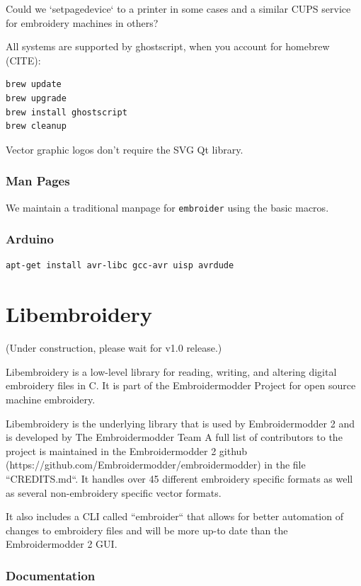 \documentclass[a4paper]{report}
\begin{document}
Could we `setpagedevice` to a printer in some cases and a similar CUPS service
for embroidery machines in others?

All systems are supported by ghostscript, when you account for homebrew (CITE):

\begin{lstlisting}
brew update
brew upgrade
brew install ghostscript
brew cleanup
\end{lstlisting}

Vector graphic logos don't require the SVG Qt library.

\subsection{Man Pages}

We maintain a traditional manpage for \texttt{embroider} using
the basic macros.

\subsection{Arduino}

\begin{lstlisting}
apt-get install avr-libc gcc-avr uisp avrdude
\end{lstlisting}

\chapter{Libembroidery}

(Under construction, please wait for v1.0 release.)

Libembroidery is a low-level library for reading, writing,
and altering digital embroidery files in C. It is part of the Embroidermodder Project
for open source machine embroidery.

Libembroidery is the underlying library that is used by Embroidermodder 2
and is developed by  The Embroidermodder Team %
A full list of contributors to the project is maintained in
the Embroidermodder 2 github (https://github.com/Embroidermodder/embroidermodder)
in the file ``CREDITS.md``. It handles over 45 different embroidery specific formats as well
as several non-embroidery specific vector formats.

It also includes a CLI called ``embroider`` that allows for better automation of
changes to embroidery files and will be more up-to date than
the Embroidermodder 2 GUI.

\subsection{Documentation}
\end{document}
